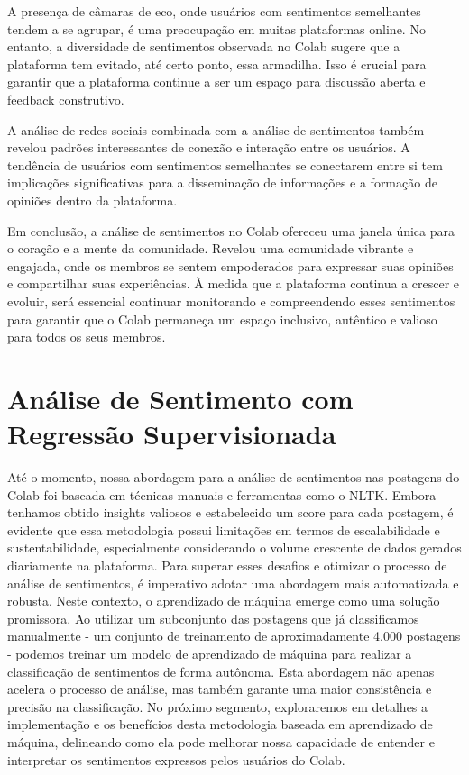 A presença de câmaras de eco, onde usuários com sentimentos semelhantes tendem a se agrupar, é uma preocupação em muitas plataformas online. No entanto, a diversidade de sentimentos observada no Colab sugere que a plataforma tem evitado, até certo ponto, essa armadilha. Isso é crucial para garantir que a plataforma continue a ser um espaço para discussão aberta e feedback construtivo.

A análise de redes sociais combinada com a análise de sentimentos também revelou padrões interessantes de conexão e interação entre os usuários. A tendência de usuários com sentimentos semelhantes se conectarem entre si tem implicações significativas para a disseminação de informações e a formação de opiniões dentro da plataforma.

Em conclusão, a análise de sentimentos no Colab ofereceu uma janela única para o coração e a mente da comunidade. Revelou uma comunidade vibrante e engajada, onde os membros se sentem empoderados para expressar suas opiniões e compartilhar suas experiências. À medida que a plataforma continua a crescer e evoluir, será essencial continuar monitorando e compreendendo esses sentimentos para garantir que o Colab permaneça um espaço inclusivo, autêntico e valioso para todos os seus membros.

\section{Análise de Sentimento com Regressão Supervisionada}
\label{sec:analise_de_sentimento_com_regressao_supervisionada}

Até o momento, nossa abordagem para a análise de sentimentos nas postagens do Colab foi baseada em técnicas manuais e ferramentas como o NLTK. Embora tenhamos obtido insights valiosos e estabelecido um score para cada postagem, é evidente que essa metodologia possui limitações em termos de escalabilidade e sustentabilidade, especialmente considerando o volume crescente de dados gerados diariamente na plataforma. Para superar esses desafios e otimizar o processo de análise de sentimentos, é imperativo adotar uma abordagem mais automatizada e robusta. Neste contexto, o aprendizado de máquina emerge como uma solução promissora. Ao utilizar um subconjunto das postagens que já classificamos manualmente - um conjunto de treinamento de aproximadamente 4.000 postagens - podemos treinar um modelo de aprendizado de máquina para realizar a classificação de sentimentos de forma autônoma. Esta abordagem não apenas acelera o processo de análise, mas também garante uma maior consistência e precisão na classificação. No próximo segmento, exploraremos em detalhes a implementação e os benefícios desta metodologia baseada em aprendizado de máquina, delineando como ela pode melhorar nossa capacidade de entender e interpretar os sentimentos expressos pelos usuários do Colab.

